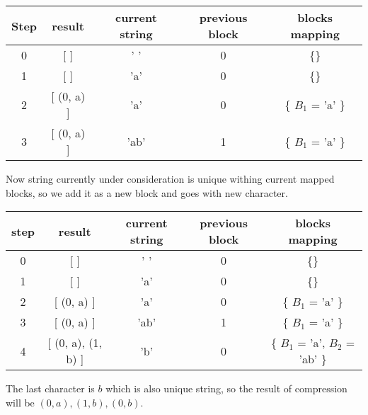 \begin{table}[H]
\begin{center}
\begin{tabular}{|c|c|c|c|c|}
\hline
\rowcolor[HTML]{C0C0C0} 
Step & result         & current string & previous block & blocks mapping   \\ \hline
0    & {[} {]}        & ' '            & 0              & \{\}             \\ \hline
1    & {[} {]}        & 'a'            & 0              & \{\}             \\ \hline
2    & {[} (0, a) {]} & 'a'            & 0              & \{ $B_1$ = 'a' \} \\ \hline
3    & {[} (0, a) {]} & 'ab'           & 1              & \{ $B_1$ = 'a' \} \\ \hline
\end{tabular}
  
\end{center}
\end{table}
Now string currently under consideration is unique withing current mapped blocks, so we add it as a new block and goes with new character.

\begin{table}[H]
\begin{center}
\begin{tabular}{|c|c|c|c|c|}
\hline
\rowcolor[HTML]{C0C0C0} 
step & result                 & current string & previous block & blocks mapping                \\ \hline
0    & {[} {]}                & ' '            & 0              & \{\}                          \\ \hline
1    & {[} {]}                & 'a'            & 0              & \{\}                          \\ \hline
2    & {[} (0, a) {]}         & 'a'            & 0              & \{ $B_1$ = 'a' \}              \\ \hline
3    & {[} (0, a) {]}         & 'ab'           & 1              & \{ $B_1$ = 'a' \}              \\ \hline
4    & {[} (0, a), (1, b) {]} & 'b'            & 0              & \{ $B_1$ = 'a', $B_2$ = 'ab' \} \\ \hline
\end{tabular}
   
\end{center}
\end{table}
The last character is $b$ which is also unique string, so the result of compression will be $(0, a), (1, b), (0, b)$.


